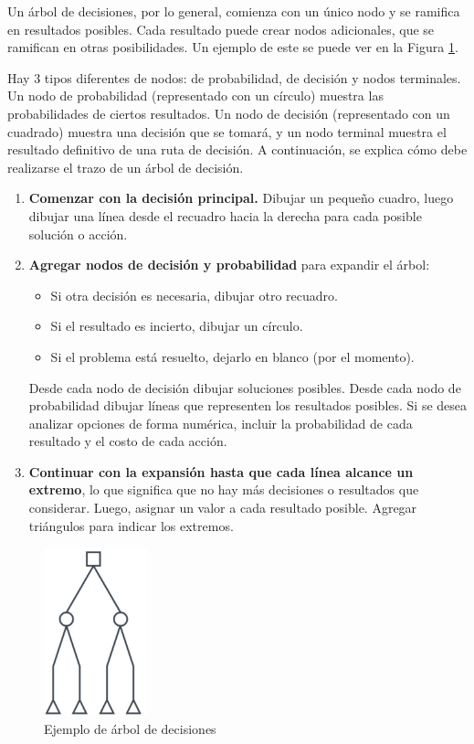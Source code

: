 Un árbol de decisiones, por lo general, comienza con un único nodo y se ramifica en resultados posibles. Cada resultado puede crear nodos adicionales, que se ramifican en otras posibilidades. Un ejemplo de este se puede ver en la Figura \ref{fig:arbol}.

Hay 3 tipos diferentes de nodos: de probabilidad, de decisión y nodos terminales. Un nodo de probabilidad (representado con un círculo) muestra las probabilidades de ciertos resultados. Un nodo de decisión (representado con un cuadrado) muestra una decisión que se tomará, y un nodo terminal muestra el resultado definitivo de una ruta de decisión. A continuación, se explica cómo debe realizarse el trazo de un árbol de decisión.

\begin{enumerate}
	\item \textbf{Comenzar con la decisión principal.}
	Dibujar un pequeño cuadro, luego dibujar una línea desde el recuadro hacia la derecha para cada posible solución o acción.
	\item \textbf{Agregar nodos de decisión y probabilidad} para expandir el árbol:
	\begin{itemize}
		\item Si otra decisión es necesaria, dibujar otro recuadro.
		\item Si el resultado es incierto, dibujar un círculo.
		\item Si el problema está resuelto, dejarlo en blanco (por el momento).
	\end{itemize}
	Desde cada nodo de decisión dibujar soluciones posibles. Desde cada nodo de probabilidad dibujar líneas que representen los resultados posibles. Si se desea analizar opciones de forma numérica, incluir la probabilidad de cada resultado y el costo de cada acción.
	\item \textbf{Continuar con la expansión hasta que cada línea alcance un extremo}, lo que significa que no hay más decisiones o resultados que considerar. Luego, asignar un valor a cada resultado posible. Agregar triángulos para indicar los extremos.
\end{enumerate}

\begin{figure}[H]
	\centering
	\includegraphics[width=3cm]{imagenes/arbol}
	\caption{Ejemplo de árbol de decisiones}
	\label{fig:arbol}
\end{figure}
\endinput